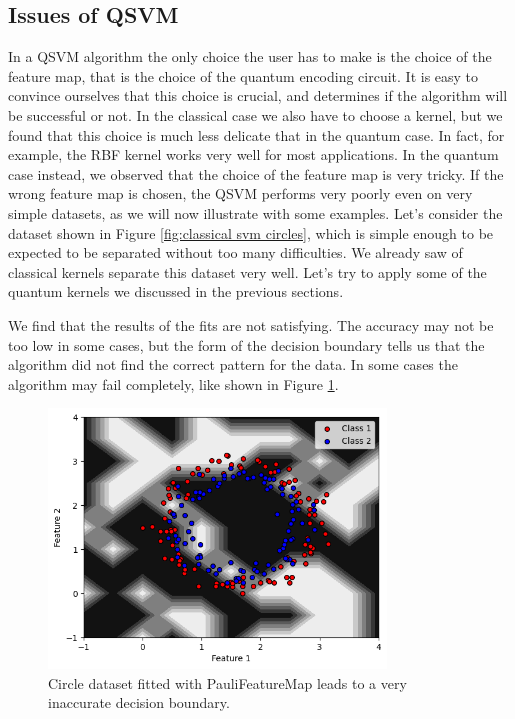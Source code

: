 \documentclass[12pt]{article}
\begin{document}
\subsection{Issues of QSVM}

In a QSVM algorithm the only choice the user has to make is the choice of the feature map, that is the choice of the quantum encoding circuit. It is easy to convince ourselves that this choice is crucial, and determines if the algorithm will be successful or not. In the classical case we also have to choose a kernel, but we found that this choice is much less delicate that in the quantum case. In fact, for example, the RBF kernel works very well for most applications. In the quantum case instead, we observed that the choice of the feature map is very tricky. If the wrong feature map is chosen, the QSVM performs very poorly even on very simple datasets, as we will now illustrate with some examples. Let's consider the dataset shown in Figure \ref{fig:classical svm circles}, which is simple enough to be expected to be separated without too many difficulties. We already saw of classical kernels separate this dataset very well. Let's try to apply some of the quantum kernels we discussed in the previous sections. 

We find that the results of the fits are not satisfying. The accuracy may not be too low in some cases, but the form of the decision boundary tells us that the algorithm did not find the correct pattern for the data. In some cases the algorithm may fail completely, like shown in Figure \ref{fig:failcircle}.
\begin{figure}[h!]
    \centering
    \includegraphics[width=0.8\textwidth]{images/failcircle.png}
    \caption{Circle dataset fitted with PauliFeatureMap leads to a very inaccurate decision boundary.}
    \label{fig:failcircle}
\end{figure}
\end{document}

